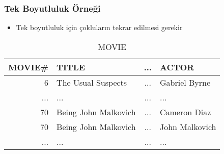 \documentclass[dvipsnames]{beamer}
\theoremstyle{plain}
\begin{document}
\begin{frame}
  \frametitle{Tek Boyutluluk Örneği}

  \begin{itemize}
    \item Tek boyutluluk için çokluların tekrar edilmesi gerekir
  \end{itemize}

  \begin{footnotesize}
  \begin{table}
    \caption{MOVIE}
    \begin{tabular}{|r|l|c|l|}\hline
MOVIE\# & TITLE                & ... & ACTOR         \\\hline\hline
      6 & The Usual Suspects   & ... & Gabriel Byrne \\\hline
    ... & ...                  & ... & ...           \\\hline
     70 & Being John Malkovich & ... & Cameron Diaz  \\\hline
     70 & Being John Malkovich & ... & John Malkovich\\\hline
    ... & ...                  & ... & ...           \\\hline
    \end{tabular}
  \end{table}
  \end{footnotesize}
\end{frame}
\end{document}
